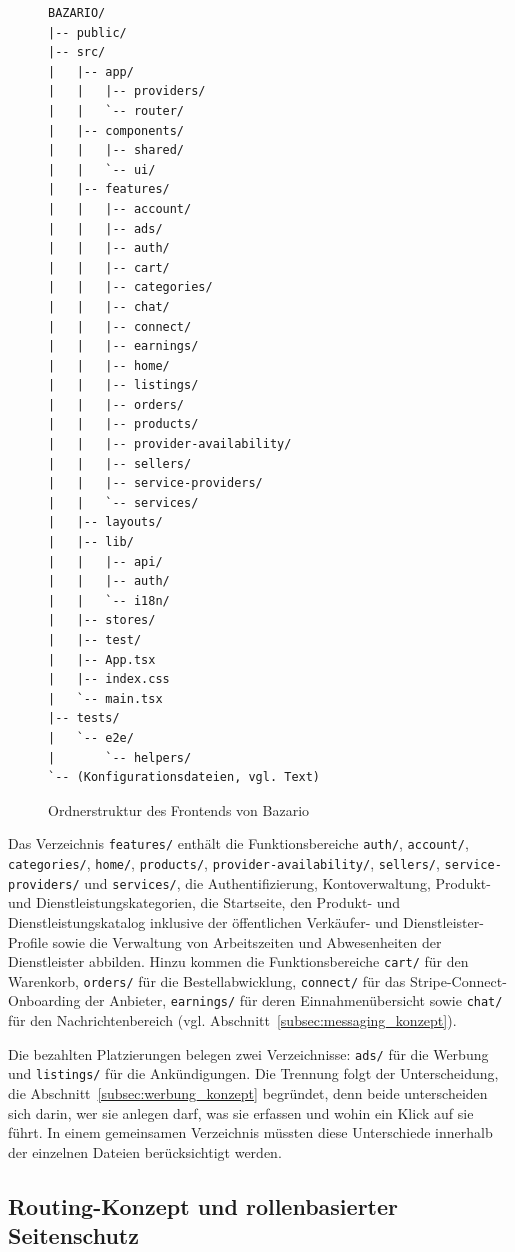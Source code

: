 \begin{figure}[H]
\centering \small
\begin{verbatim}
BAZARIO/
|-- public/
|-- src/
|   |-- app/
|   |   |-- providers/
|   |   `-- router/
|   |-- components/
|   |   |-- shared/
|   |   `-- ui/
|   |-- features/
|   |   |-- account/
|   |   |-- ads/
|   |   |-- auth/
|   |   |-- cart/
|   |   |-- categories/
|   |   |-- chat/
|   |   |-- connect/
|   |   |-- earnings/
|   |   |-- home/
|   |   |-- listings/
|   |   |-- orders/
|   |   |-- products/
|   |   |-- provider-availability/
|   |   |-- sellers/
|   |   |-- service-providers/
|   |   `-- services/
|   |-- layouts/
|   |-- lib/
|   |   |-- api/
|   |   |-- auth/
|   |   `-- i18n/
|   |-- stores/
|   |-- test/
|   |-- App.tsx
|   |-- index.css
|   `-- main.tsx
|-- tests/
|   `-- e2e/
|       `-- helpers/
`-- (Konfigurationsdateien, vgl. Text)
\end{verbatim}
\caption{Ordnerstruktur des Frontends von Bazario}
\label{fig:ordnerstruktur}
\end{figure}

Das Verzeichnis \texttt{features/} enthält die Funktionsbereiche
\texttt{auth/}, \texttt{account/}, \texttt{categories/},
\texttt{home/}, \texttt{products/}, \texttt{provider-availability/},
\texttt{sellers/}, \texttt{service-providers/} und
\texttt{services/}, die Authentifizierung, Kontoverwaltung, Produkt-
und Dienstleistungskategorien, die Startseite, den Produkt- und
Dienstleistungskatalog inklusive der öffentlichen Verkäufer- und
Dienstleister-Profile sowie die Verwaltung von Arbeitszeiten und
Abwesenheiten der Dienstleister abbilden. Hinzu kommen die
Funktionsbereiche \texttt{cart/} für den Warenkorb, \texttt{orders/}
für die Bestellabwicklung, \texttt{connect/} für das
Stripe-Connect-Onboarding der Anbieter, \texttt{earnings/} für deren
Einnahmenübersicht sowie \texttt{chat/} für den Nachrichtenbereich
(vgl. Abschnitt~\ref{subsec:messaging_konzept}).

Die bezahlten Platzierungen belegen zwei Verzeichnisse:
\texttt{ads/} für die Werbung und \texttt{listings/} für die
Ankündigungen. Die Trennung folgt der Unterscheidung, die
Abschnitt~\ref{subsec:werbung_konzept} begründet, denn beide
unterscheiden sich darin, wer sie anlegen darf, was sie erfassen und
wohin ein Klick auf sie führt. In einem gemeinsamen Verzeichnis
müssten diese Unterschiede innerhalb der einzelnen Dateien
berücksichtigt werden.


\subsection{Routing-Konzept und rollenbasierter Seitenschutz}
\label{subsec:routing-konzept}

